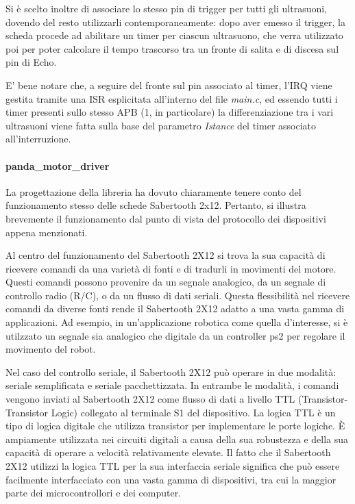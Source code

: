 \documentclass{article}
\begin{document}
          Si è scelto inoltre di associare lo stesso pin di trigger per tutti gli ultrasuoni, dovendo del resto utilizzarli contemporaneamente: dopo aver emesso il trigger, la scheda procede ad abilitare un timer per ciascun ultrasuono, che verra utilizzato poi per poter calcolare il tempo trascorso tra un fronte di salita e di discesa sul pin di Echo.

          E' bene notare che, a seguire del fronte sul pin associato al timer, l'IRQ viene gestita tramite una ISR esplicitata all'interno del file \textit{main.c}, ed essendo tutti i timer presenti sullo stesso APB (1, in particolare) la differenziazione tra i vari ultrasuoni viene fatta sulla base del parametro \textit{Istance} del timer associato all'interruzione. 


          \paragraph{panda\_motor\_driver} La progettazione della libreria ha dovuto chiaramente tenere conto del funzionamento stesso delle schede Sabertooth 2x12. Pertanto, si illustra brevemente il funzionamento dal punto di vista del protocollo dei dispositivi appena menzionati. 

          Al centro del funzionamento del Sabertooth 2X12 si trova la sua capacità di ricevere comandi da una varietà di fonti e di tradurli in movimenti del motore. Questi comandi possono provenire da un segnale analogico, da un segnale di controllo radio (R/C), o da un flusso di dati seriali. Questa flessibilità nel ricevere comandi da diverse fonti rende il Sabertooth 2X12 adatto a una vasta gamma di applicazioni. Ad esempio, in un’applicazione robotica come quella d'interesse, si è utilzzato un segnale sia analogico che digitale da un controller ps2 per regolare il movimento del robot.

          Nel caso del controllo seriale, il Sabertooth 2X12 può operare in due modalità: seriale semplificata e seriale pacchettizzata. In entrambe le modalità, i comandi vengono inviati al Sabertooth 2X12 come flusso di dati a livello TTL (Transistor-Transistor Logic) collegato al terminale S1 del dispositivo. La logica TTL è un tipo di logica digitale che utilizza transistor per implementare le porte logiche. È ampiamente utilizzata nei circuiti digitali a causa della sua robustezza e della sua capacità di operare a velocità relativamente elevate. Il fatto che il Sabertooth 2X12 utilizzi la logica TTL per la sua interfaccia seriale significa che può essere facilmente interfacciato con una vasta gamma di dispositivi, tra cui la maggior parte dei microcontrollori e dei computer.
\end{document}
